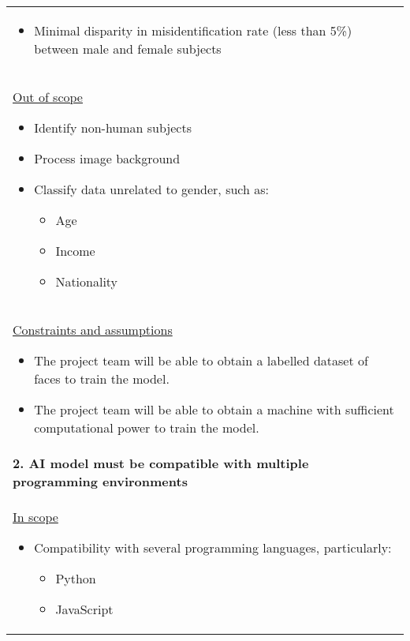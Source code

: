 \begin{longtable}{ | p{} l | }
{\begin{itemize}
\begin{itemize}
                    \item Mouth
                \end{itemize}
            \item Minimal disparity in misidentification rate (less than 5\%) between male and female subjects
        \end{itemize}
    } \\
    \multicolumn{2}{|p{\textwidth}|}{\hspace{0.6cm}\underline{Out of scope}
        \begin{itemize}
            \item Identify non-human subjects
            \item Process image background
            \item Classify data unrelated to gender, such as:
                \begin{itemize}
                    \item Age
                    \item Income
                    \item Nationality
                \end{itemize}
        \end{itemize}
    } \\
    \multicolumn{2}{|p{\textwidth}|}{\hspace{0.6cm}\underline{Constraints and assumptions}
        \begin{itemize}
            \item The project team will be able to obtain a labelled dataset of faces to train the model.
            \item The project team will be able to obtain a machine with sufficient computational power to train the model.
        \end{itemize}
    } \\
    \multicolumn{2}{|p{\textwidth}|}{\textbf{2. AI model must be compatible with multiple programming environments}} \\
    \multicolumn{2}{|p{\textwidth}|}{\hspace{0.6cm}\underline{In scope}
        \begin{itemize}
            \item Compatibility with several programming languages, particularly:
                \begin{itemize}
                    \item Python
                    \item JavaScript

\end{itemize}
\end{itemize}}
\end{longtable}
